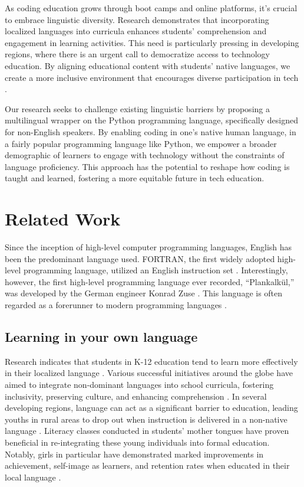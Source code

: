 \documentclass[conference]{IEEEtran}
\begin{document}
As coding education grows through boot camps and online platforms, it's crucial to embrace linguistic diversity. Research demonstrates that incorporating localized languages into curricula enhances students' comprehension and engagement in learning activities. This need is particularly pressing in developing regions, where there is an urgent call to democratize access to technology education. By aligning educational content with students' native languages, we create a more inclusive environment that encourages diverse participation in tech \cite{Difficulties_of_Learning}.

Our research seeks to challenge existing linguistic barriers by proposing a multilingual wrapper on the Python programming language, specifically designed for non-English speakers. By enabling coding in one's native human language, in a fairly popular programming language like Python, we empower a broader demographic of learners to engage with technology without the constraints of language proficiency. This approach has the potential to reshape how coding is taught and learned, fostering a more equitable future in tech education.

\section{Related Work}

Since the inception of high-level computer programming languages, English has been the predominant language used. FORTRAN, the first widely adopted high-level programming language, utilized an English instruction set \cite{backus1978history}. Interestingly, however, the first high-level programming language ever recorded, “Plankalkül,” was developed by the German engineer Konrad Zuse \cite{zuse1963ansaetze}. This language is often regarded as a forerunner to modern programming languages \cite{bauer1972plankalkul}.
\subsection{Learning in your own language}

Research indicates that students in K-12 education tend to learn more effectively in their localized language \cite{buhmann2008mother}. Various successful initiatives around the globe have aimed to integrate non-dominant languages into school curricula, fostering inclusivity, preserving culture, and enhancing comprehension \cite{taylor2015finding}. In several developing regions, language can act as a significant barrier to education, leading youths in rural areas to drop out when instruction is delivered in a non-native language \cite{trudell2009local}. Literacy classes conducted in students' mother tongues have proven beneficial in re-integrating these young individuals into formal education. Notably, girls in particular have demonstrated marked improvements in achievement, self-image as learners, and retention rates when educated in their local language \cite{unescobangkok2005mothertongue}.
\end{document}
